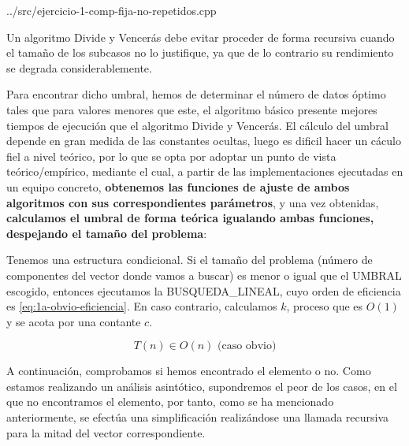 



{../src/ejercicio-1-comp-fija-no-repetidos.cpp} 


Un algoritmo Divide y Vencerás debe evitar proceder de forma recursiva cuando el tamaño de los subcasos no lo justifique, ya que
de lo contrario su rendimiento se degrada considerablemente. 

Para encontrar dicho umbral, hemos de determinar el número de datos óptimo tales que para valores menores que este, el algoritmo básico 
presente mejores tiempos de ejecución que el algoritmo Divide y Vencerás. El cálculo del umbral depende en gran medida de las constantes ocultas, 
luego es dificil hacer un cáculo fiel a nivel teórico, por lo que se opta por adoptar un punto de vista teórico/empírico, mediante el cual, a partir de las 
implementaciones ejecutadas en un equipo concreto, \textbf{obtenemos las funciones de ajuste de ambos algoritmos con sus correspondientes 
parámetros}, y una vez obtenidas, \textbf{calculamos el umbral de forma teórica igualando ambas funciones, despejando el tamaño del problema}: 




Tenemos una estructura condicional. Si el tamaño del problema (número de componentes del vector donde 
vamos a buscar) es menor o igual que el UMBRAL escogido, entonces ejecutamos la BUSQUEDA\_LINEAL, cuyo orden de eficiencia es \ref{eq:1a-obvio-eficiencia}. 
En caso contrario, calculamos $k$, proceso que es $O(1)$ y se acota por una contante $c$. 

\begin{equation}
	\boxed{T(n) \in O (n)} \text{ (caso obvio)}
	\label{eq:1a-obvio-eficiencia}
\end{equation}

A continuación, comprobamos si hemos encontrado el elemento o no. Como estamos realizando un análisis asintótico, supondremos
el peor de los casos, en el que no encontramos el elemento, por tanto, como se ha mencionado anteriormente,
se efectúa una simplificación realizándose una llamada recursiva para la mitad del vector correspondiente.

